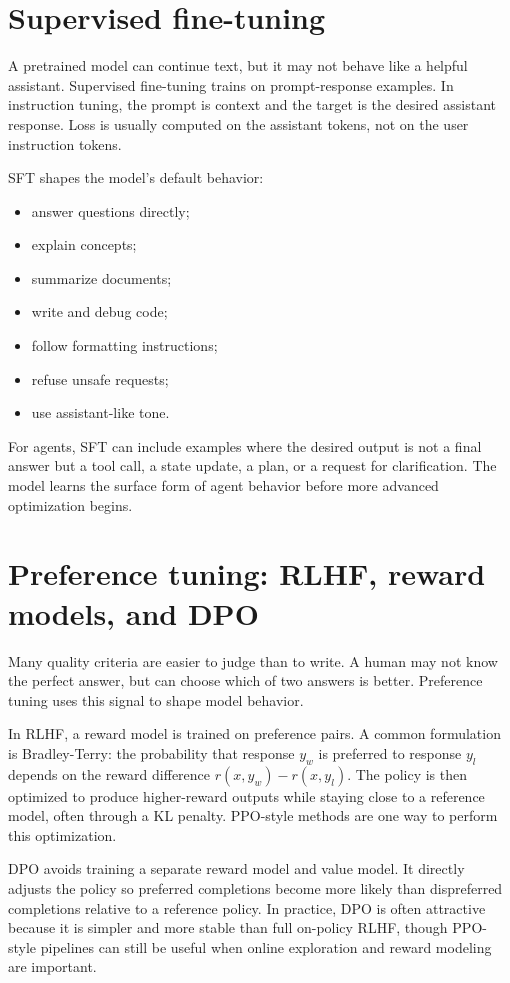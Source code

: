 \section{Supervised fine-tuning}

A pretrained model can continue text, but it may not behave like a helpful assistant. Supervised fine-tuning trains on prompt-response examples. In instruction tuning, the prompt is context and the target is the desired assistant response. Loss is usually computed on the assistant tokens, not on the user instruction tokens.

SFT shapes the model's default behavior:

\begin{itemize}[leftmargin=*]
  \item answer questions directly;
  \item explain concepts;
  \item summarize documents;
  \item write and debug code;
  \item follow formatting instructions;
  \item refuse unsafe requests;
  \item use assistant-like tone.
\end{itemize}

For agents, SFT can include examples where the desired output is not a final answer but a tool call, a state update, a plan, or a request for clarification. The model learns the surface form of agent behavior before more advanced optimization begins.

\section{Preference tuning: RLHF, reward models, and DPO}

Many quality criteria are easier to judge than to write. A human may not know the perfect answer, but can choose which of two answers is better. Preference tuning uses this signal to shape model behavior.

In RLHF, a reward model is trained on preference pairs. A common formulation is Bradley-Terry: the probability that response $y_w$ is preferred to response $y_l$ depends on the reward difference $r(x,y_w)-r(x,y_l)$. The policy is then optimized to produce higher-reward outputs while staying close to a reference model, often through a KL penalty. PPO-style methods are one way to perform this optimization.

DPO avoids training a separate reward model and value model. It directly adjusts the policy so preferred completions become more likely than dispreferred completions relative to a reference policy. In practice, DPO is often attractive because it is simpler and more stable than full on-policy RLHF, though PPO-style pipelines can still be useful when online exploration and reward modeling are important.

